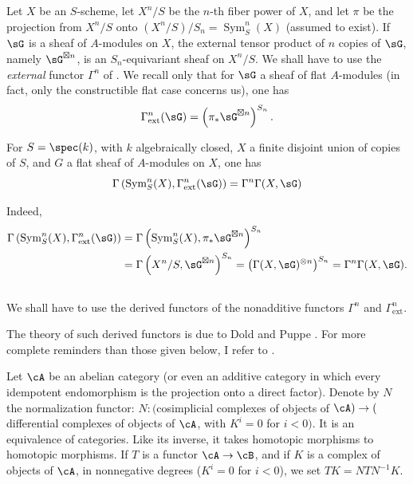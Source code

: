 Let $X$ be an $S$-scheme, let $X^n/S$ be the $n$-th fiber power of $X$, and
let $\pi$ be the projection from $X^n/S$ onto
$(X^n/S)/S_n=\operatorname{Sym}_S^n(X)$ (assumed to exist). If $\sG$ is a
sheaf of $A$-modules on $X$, the external tensor product of $n$ copies of
$\sG$, namely $\sG^{\boxtimes n}$, is an $S_n$-equivariant sheaf on $X^n/S$.
We shall have to use the \emph{external} functor $\Gamma^n$ of
. We recall only that for $\sG$ a sheaf of flat
$A$-modules (in fact, only the constructible flat case concerns us), one has
\[
  \Gamma_\text{ext}^n(\sG) = \left(\pi_*\sG^{\boxtimes n}\right)^{S_n} \text{.}
\]






\begin{lemma_}\label{III:1-3}
For $S=\spec(k)$, with $k$ algebraically closed, $X$ a finite disjoint union of
copies of $S$, and $G$ a flat sheaf of $A$-modules on $X$, one has
\[
  \Gamma\left(\operatorname{Sym}_S^n(X),\Gamma_\text{ext}^n(\sG)\right) = \Gamma^n \Gamma(X,\sG)
\]
\end{lemma_}

Indeed,
\begin{align*}
  \Gamma\left(\operatorname{Sym}_S^n(X),\Gamma_\text{ext}^n(\sG)\right)
    &= \Gamma\left(\operatorname{Sym}_S^n(X),\pi_*\sG^{\boxtimes n}\right)^{S_n} \\
    &= \Gamma\left(X^n/S,\sG^{\boxtimes n}\right)^{S_n}
    = \left(\Gamma(X,\sG)^{\otimes n}\right)^{S_n}
    = \Gamma^n \Gamma(X,\sG) \text{.}
\end{align*}






\subsection{}\label{III:1-4}

We shall have to use the derived functors of the nonadditive functors
$\Gamma^n$ and $\Gamma_\text{ext}^n$.

The theory of such derived functors is due to Dold and Puppe
. For more complete reminders than those given below, I refer to
.

Let $\cA$ be an abelian category (or even an additive category in which every
idempotent endomorphism is the projection onto a direct factor). Denote by $N$
the normalization functor: $N:($cosimplicial complexes of objects of
$\cA)\to($differential complexes of objects of $\cA$, with $K^i=0$ for
$i<0)$. It is an equivalence of categories. Like its inverse, it takes
homotopic morphisms to homotopic morphisms. If $T$ is a functor
$\cA\to\cB$, and if $K$ is a complex of objects of $\cA$, in nonnegative
degrees ($K^i=0$ for $i<0$), we set $T K=N T N^{-1} K$.





